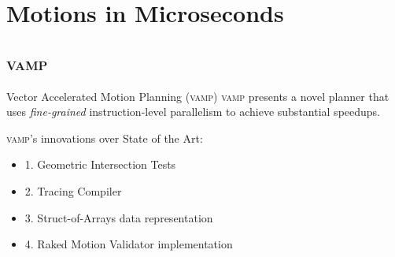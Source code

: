 \documentclass{beamer}
\begin{document}
\section{Motions in Microseconds}

\subsection{\textsc{vamp}}


%
%

\begin{frame}{Vector Accelerated Motion Planning (\textsc{vamp})}
\textsc{vamp} presents a novel planner that uses \textit{fine-grained} instruction-level parallelism to achieve substantial speedups.

\vspace{10px}

\pause
\textsc{vamp}'s innovations over State of the Art:
\begin{itemize}
\item 1. Geometric Intersection Tests
\item 2. Tracing Compiler
\item 3. Struct-of-Arrays data representation
\item 4. Raked Motion Validator implementation
\end{itemize}
\end{frame}
\end{document}
